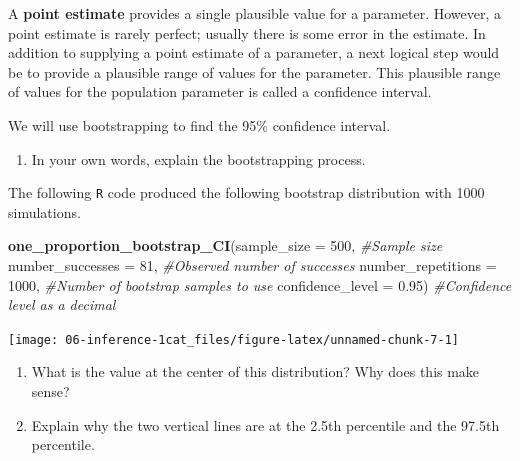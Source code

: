 \documentclass[
]{report}
\newenvironment{Shaded}{\begin{snugshade}}{\end{snugshade}}
\newcommand{\CommentTok}[1]{\textcolor[rgb]{0.56,0.35,0.01}{\textit{#1}}}
\newcommand{\DataTypeTok}[1]{\textcolor[rgb]{0.13,0.29,0.53}{#1}}
\newcommand{\DecValTok}[1]{\textcolor[rgb]{0.00,0.00,0.81}{#1}}
\newcommand{\FloatTok}[1]{\textcolor[rgb]{0.00,0.00,0.81}{#1}}
\newcommand{\KeywordTok}[1]{\textcolor[rgb]{0.13,0.29,0.53}{\textbf{#1}}}
\newcommand{\NormalTok}[1]{#1}
\providecommand{\tightlist}{%
  \setlength{\itemsep}{0pt}\setlength{\parskip}{0pt}}
\begin{document}
\newpage

A \textbf{point estimate} provides a single plausible value for a parameter. However, a point estimate is rarely perfect; usually there is some error in the estimate. In addition to supplying a point estimate of a parameter, a next logical step would be to provide a plausible range of values for the parameter. This plausible range of values for the population parameter is called a confidence interval.

We will use bootstrapping to find the 95\% confidence interval.

\begin{enumerate}
\def\labelenumi{\arabic{enumi}.}
\setcounter{enumi}{23}
\tightlist
\item
  In your own words, explain the bootstrapping process.
  \vspace{1in}
\end{enumerate}

The following \texttt{R} code produced the following bootstrap distribution with 1000 simulations.

\begin{Shaded}
\begin{Highlighting}[]
\KeywordTok{one\_proportion\_bootstrap\_CI}\NormalTok{(}\DataTypeTok{sample\_size =} \DecValTok{500}\NormalTok{, }\CommentTok{\#Sample size}
                    \DataTypeTok{number\_successes =} \DecValTok{81}\NormalTok{, }\CommentTok{\#Observed number of successes}
                    \DataTypeTok{number\_repetitions =} \DecValTok{1000}\NormalTok{, }\CommentTok{\#Number of bootstrap samples to use}
                    \DataTypeTok{confidence\_level =} \FloatTok{0.95}\NormalTok{) }\CommentTok{\#Confidence level as a decimal}
\end{Highlighting}
\end{Shaded}

\begin{center}\texttt{[image: 06-inference-1cat\_files/figure-latex/unnamed-chunk-7-1]} \end{center}

\begin{enumerate}
\def\labelenumi{\arabic{enumi}.}
\setcounter{enumi}{24}
\item
  What is the value at the center of this distribution? Why does this make sense?
  \vspace{.8in}
\item
  Explain why the two vertical lines are at the 2.5th percentile and the 97.5th percentile.
\end{enumerate}
\end{document}
